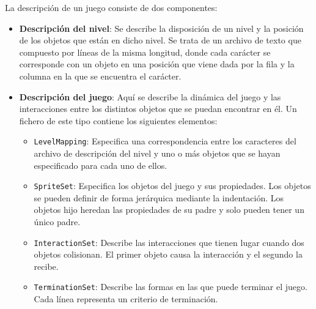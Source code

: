 La descripción de un juego consiste de dos componentes:

\begin{itemize}
    \item \textbf{Descripción del nivel}: Se describe la disposición
    de un nivel y la posición de los objetos que están en dicho nivel. Se trata
    de un archivo de texto que compuesto por líneas de la misma longitud, donde
    cada carácter se corresponde con un objeto en una posición que viene dada por la fila
    y la columna en la que se encuentra el carácter.
    \item \textbf{Descripción del juego}: Aquí se describe la dinámica del juego y las
    interacciones entre los distintos objetos que se puedan encontrar en él. Un fichero
    de este tipo contiene los siguientes elementos:
    \begin{itemize}
        \item \texttt{LevelMapping}: Especifica una correspondencia entre los caracteres del archivo
        de descripción del nivel y uno o más objetos que se hayan especificado para cada uno de ellos.
        \item \texttt{SpriteSet}: Especifica los objetos del juego y sus propiedades. Los objetos
        se pueden definir de forma jerárquica mediante la indentación. Los objetos hijo heredan las propiedades
        de su padre y solo pueden tener un único padre.
        \item \texttt{InteractionSet}: Describe las interacciones que tienen lugar cuando dos objetos
        colisionan. El primer objeto causa la interacción y el segundo la recibe.
        \item \texttt{TerminationSet}: Describe las formas en las que puede terminar el juego. Cada
        línea representa un criterio de terminación.
    \end{itemize}
\end{itemize}

